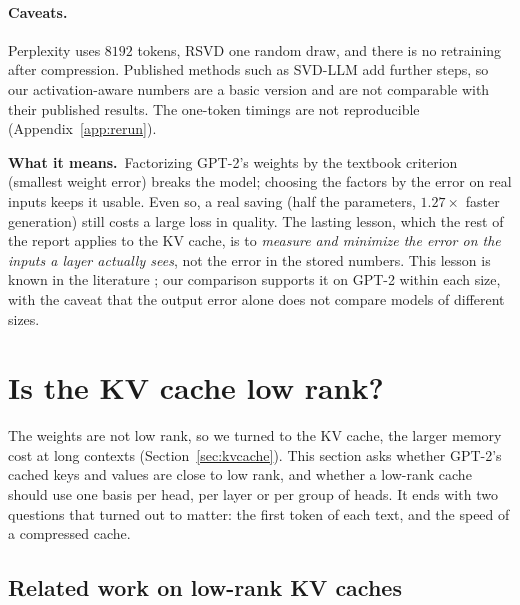 \documentclass[10pt]{article}
\theoremstyle{plain}
\theoremstyle{definition}
\theoremstyle{remark}
\newcommand{\means}{\noindent\textbf{What it means.}\ }
\begin{document}
\paragraph{Caveats.}
Perplexity uses $8192$ tokens, RSVD one random draw, and there is no retraining after compression. Published methods such as SVD-LLM add further steps, so our activation-aware numbers are a basic version and are not comparable with their published results. The one-token timings are not reproducible (Appendix~\ref{app:rerun}).

\means Factorizing GPT-2's weights by the textbook criterion (smallest weight error) breaks the model; choosing the factors by the error on real inputs keeps it usable. Even so, a real saving (half the parameters, $1.27\times$ faster generation) still costs a large loss in quality. The lasting lesson, which the rest of the report applies to the KV cache, is to \emph{measure and minimize the error on the inputs a layer actually sees}, not the error in the stored numbers. This lesson is known in the literature \cite{hsu2022,wang2025svdllm,yuan2023asvd}; our comparison supports it on GPT-2 within each size, with the caveat that the output error alone does not compare models of different sizes.


\section{Is the KV cache low rank?}
\label{sec:kv}

The weights are not low rank, so we turned to the KV cache, the larger memory cost at long contexts (Section~\ref{sec:kvcache}). This section asks whether GPT-2's cached keys and values are close to low rank, and whether a low-rank cache should use one basis per head, per layer or per group of heads. It ends with two questions that turned out to matter: the first token of each text, and the speed of a compressed cache.

\subsection{Related work on low-rank KV caches}
\label{sec:relwork}
\end{document}
